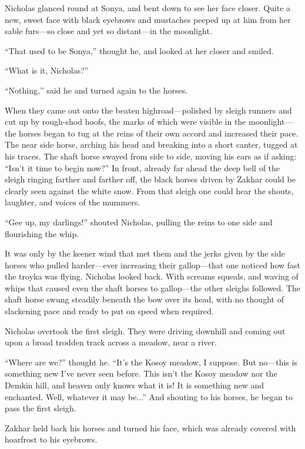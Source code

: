 Nicholas glanced round at Sonya, and bent down to see her face
closer.  Quite a new, sweet face with black eyebrows and
mustaches peeped up at him from her sable furs---so close and yet
so distant---in the moonlight.

``That used to be Sonya,'' thought he, and looked at her closer
and smiled.

``What is it, Nicholas?''

``Nothing,'' said he and turned again to the horses.

When they came out onto the beaten highroad---polished by sleigh
runners and cut up by rough-shod hoofs, the marks of which were
visible in the moonlight---the horses began to tug at the reins
of their own accord and increased their pace. The near side
horse, arching his head and breaking into a short canter, tugged
at his traces. The shaft horse swayed from side to side, moving
his ears as if asking: ``Isn't it time to begin now?'' In front,
already far ahead the deep bell of the sleigh ringing farther and
farther off, the black horses driven by Zakhar could be clearly
seen against the white snow. From that sleigh one could hear the
shouts, laughter, and voices of the mummers.

``Gee up, my darlings!'' shouted Nicholas, pulling the reins to
one side and flourishing the whip.

It was only by the keener wind that met them and the jerks given
by the side horses who pulled harder---ever increasing their
gallop---that one noticed how fast the troyka was
flying. Nicholas looked back. With screams squeals, and waving of
whips that caused even the shaft horses to gallop---the other
sleighs followed. The shaft horse swung steadily beneath the bow
over its head, with no thought of slackening pace and ready to
put on speed when required.

Nicholas overtook the first sleigh. They were driving downhill
and coming out upon a broad trodden track across a meadow, near a
river.

``Where are we?'' thought he. ``It's the Kosoy meadow, I
suppose. But no---this is something new I've never seen
before. This isn't the Kosoy meadow nor the Demkin hill, and
heaven only knows what it is! It is something new and
enchanted. Well, whatever it may be...'' And shouting to his
horses, he began to pass the first sleigh.

Zakhar held back his horses and turned his face, which was
already covered with hoarfrost to his eyebrows.

